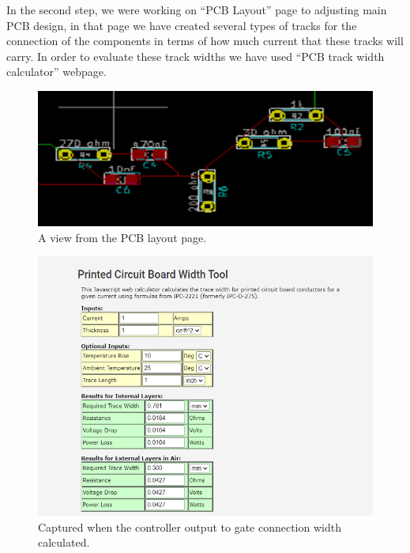 \documentclass{article}
\begin{document}
In the second step, we were working on “PCB Layout” page to adjusting main PCB design, in that page we have created several types of tracks for the connection of the components in terms of how much current that these tracks will carry. In order to evaluate these track widths 
we have used “PCB track width calculator” webpage.




\begin{figure}[H]
    \centering
    \includegraphics[scale=0.9]{PCB4.png}
    \caption{A view from the PCB layout page.}
    \label{fig:my_label}
\end{figure}

\begin{figure}[H]
    \centering
    \includegraphics[scale=0.9]{PCB5.png}
    \caption{Captured when the controller output to gate  connection width calculated.}
    \label{fig:my_label}
\end{figure}
\end{document}

